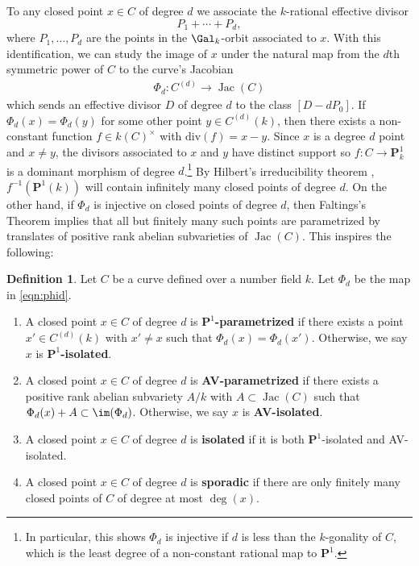 \documentclass[11pt,reqno]{amsart}
\theoremstyle{plain}
\theoremstyle{definition}
\newtheorem{definition}[theorem]{Definition}
\newcommand{\PP}{\mathbf P}
\newcommand{\Jac}{\operatorname{Jac}}
\begin{document}
To any closed point $x \in C$ of degree $d$ we associate the $k$-rational effective divisor
\[
P_1+ \cdots +P_{d}, 
\] 
where $P_1, \dots, P_{d}$ are the points in the $\Gal_{k}$-orbit associated to $x$. With this identification, we can study the image of $x$ under the natural map from the $d$th symmetric power of $C$ to the curve's Jacobian
\begin{align}
\label{eqn:phid}
\Phi_d\colon C^{(d)} \rightarrow \Jac(C)
\end{align}
which sends an effective divisor $D$ of degree $d$ to the class $[D - dP_0]$. If $\Phi_d(x)=\Phi_d(y)$ for some other point $y \in C^{(d)}(k)$, then there exists a non-constant function $f \in k(C)^{\times}$ with $\text{div}(f)=x-y$. Since $x$ is a degree $d$ point and $x\not=y$, the divisors associated to $x$ and $y$ have distinct support so $f\colon C \rightarrow \mathbf{P}^1_{k}$ is a dominant morphism of degree $d$.\footnote{In particular, this shows $\Phi_d$ is injective if $d$ is less than the $k$-gonality of $C$, which is the least degree of a non-constant rational map to $\mathbf{P}^1$.} By Hilbert's irreducibility theorem \cite[Chapter 9]{serre97}, $f^{-1}(\mathbf{P}^{1}(k))$ will contain infinitely many closed points of degree $d$. On the other hand, if $\Phi_d$ is injective on closed points of degree $d$, then Faltings's Theorem \cite{faltings} implies that all but finitely many such points are parametrized by translates of positive rank abelian subvarieties of $\Jac(C)$. This inspires the following:
\begin{definition} Let $C$ be a curve defined over a number field $k$. Let $\Phi_d$ be the map in \eqref{eqn:phid}.
\begin{enumerate}
\item A closed point $x \in C$ of degree $d$ is $\PP^1$\textbf{-parametrized} if there exists a point $x' \in C^{(d)}(k)$ with $x' \neq x$ such that $\Phi_d(x)=\Phi_d(x')$. Otherwise, we say $x$ is $\PP^1$\textbf{-isolated}.
\item A closed point $x \in C$ of degree $d$ is \textbf{AV-parametrized} if there exists a positive rank abelian subvariety $A/k$ with  $A \subset \Jac(C)$ such that $\Phi_d(x)+A \subset \im(\Phi_d)$. Otherwise, we say $x$ is \textbf{AV-isolated}.
\item A closed point $x \in C$ of degree $d$ is \textbf{isolated} if it is both $\PP^1$-isolated and AV-isolated.
\item A closed point $x \in C$ of degree $d$ is \textbf{sporadic} if there are only finitely many closed points of $C$ of degree at most $\deg(x)$.
\end{enumerate}
\end{definition}
\end{document}
